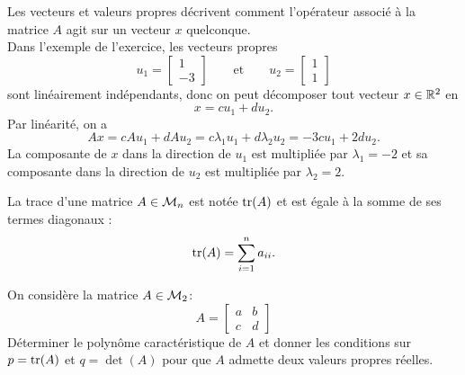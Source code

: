 \remark Les vecteurs et valeurs propres décrivent comment l'opérateur associé à la matrice $A$ agit sur un vecteur $x$ quelconque. \\
Dans l'exemple de l'exercice, les vecteurs propres 
$$
u_1 = \left[\begin{array}{r} 1 \\ -3 \end{array}\right]
\qquad \text{et} \qquad 
u_2 = \left[\begin{array}{r} 1 \\ 1 \end{array}\right]
$$
sont linéairement indépendants, donc on peut décomposer tout vecteur $x \in \mathbb{R}^2$ en
$$
x = c u_1 + d u_2.
$$
Par linéarité, on a 
$$
A x = c A u_1 + d A u_2 = c \lambda_1 u_1 + d \lambda_2 u_2 = -3 c u_1 + 2 d u_2.
$$
La composante de $x$ dans la direction de $u_1$ est multipliée par $\lambda_1 = -2$ et sa composante dans la direction de $u_2$ est multipliée par $\lambda_2 = 2$.


\newpage
\begin{definition}[Trace]
  La trace d'une matrice $A \in \mathcal{M}_n$ est notée $\operatorname{tr}(A)$ et est égale à la somme de ses termes diagonaux :
  $$
  \operatorname{tr}(A) = \sum_{i=1}^n a_{ii}.
  $$
\end{definition}


\begin{exercise*}
  On considère la matrice $A \in \mathcal{M}_2$:
  $$
  A = \left[\begin{array}{cc} a & b \\ c & d\end{array}\right]
  $$
  Déterminer le polynôme caractéristique de $A$ et donner les conditions sur $p = \operatorname{tr}(A)$ et $q = \det(A)$ pour que $A$ admette deux valeurs propres réelles.
\end{exercise*}


